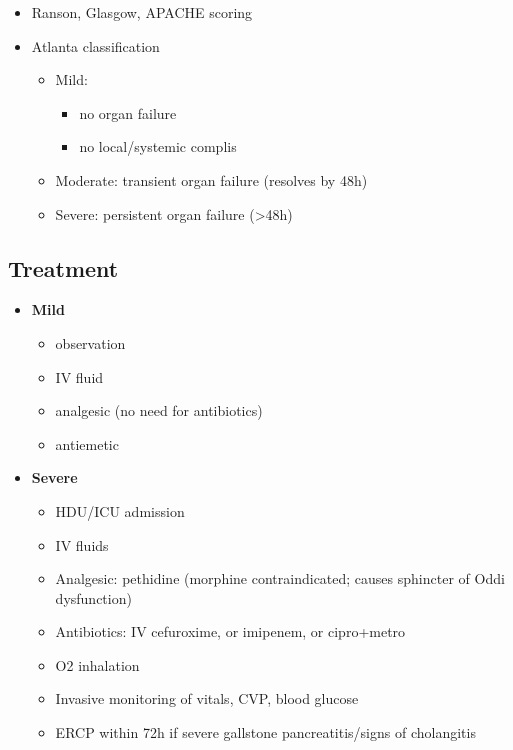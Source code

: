 \documentclass[
  14pt,
]{memoir}
\providecommand{\tightlist}{%
  \setlength{\itemsep}{0pt}\setlength{\parskip}{0pt}}
\begin{document}
\begin{itemize}
\tightlist
\item
  Ranson, Glasgow, APACHE scoring
\item
  Atlanta classification

  \begin{itemize}
  \tightlist
  \item
    Mild:

    \begin{itemize}
    \tightlist
    \item
      no organ failure
    \item
      no local/systemic complis
    \end{itemize}
  \item
    Moderate: transient organ failure (resolves by 48h)
  \item
    Severe: persistent organ failure (\textgreater48h)
  \end{itemize}
\end{itemize}

\hypertarget{treatment-9}{%
\subsection{Treatment}\label{treatment-9}}

\begin{itemize}
\tightlist
\item
  \textbf{Mild}

  \begin{itemize}
  \tightlist
  \item
    observation
  \item
    IV fluid
  \item
    analgesic (no need for antibiotics)
  \item
    antiemetic
  \end{itemize}
\item
  \textbf{Severe}

  \begin{itemize}
  \tightlist
  \item
    HDU/ICU admission
  \item
    IV fluids
  \item
    Analgesic: pethidine (morphine contraindicated; causes sphincter of
    Oddi dysfunction)
  \item
    Antibiotics: IV cefuroxime, or imipenem, or cipro+metro
  \item
    O2 inhalation
  \item
    Invasive monitoring of vitals, CVP, blood glucose
  \item
    ERCP within 72h if severe gallstone pancreatitis/signs of
    cholangitis
  \end{itemize}
\end{itemize}
\end{document}
